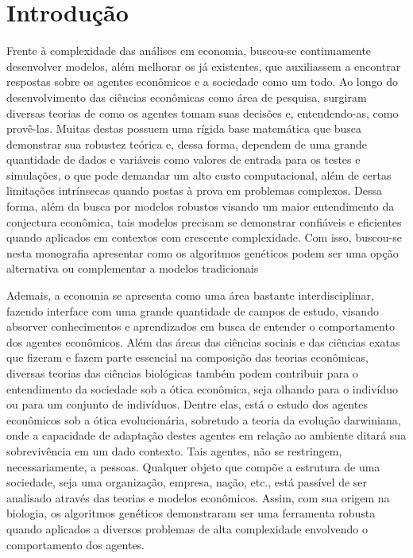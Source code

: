 \chapter{Introdução}

Frente à complexidade das análises em economia, buscou-se continuamente desenvolver modelos, além melhorar os já existentes, que auxiliassem a encontrar respostas sobre os agentes econômicos e a sociedade como um todo. Ao longo do desenvolvimento das ciências econômicas como área de pesquisa, surgiram diversas teorias de como os agentes tomam suas decisões e, entendendo-as, como provê-las. Muitas destas possuem uma rígida base matemática que busca demonstrar sua robustez teórica e, dessa forma, dependem de uma grande quantidade de dados e variáveis como valores de entrada para os testes e simulações, o que pode demandar um alto custo computacional, além de certas limitações intrínsecas quando postas à prova em problemas complexos. Dessa forma, além da busca por modelos robustos visando um maior entendimento da conjectura econômica, tais modelos precisam se demonstrar confiáveis e eficientes quando aplicados em contextos com crescente complexidade. Com isso, buscou-se nesta monografia apresentar como os algoritmos genéticos podem ser uma opção alternativa ou complementar a modelos tradicionais 

Ademais, a economia se apresenta como uma área bastante interdisciplinar, fazendo interface com uma grande quantidade de campos de estudo, visando absorver conhecimentos e aprendizados em busca de entender o comportamento dos agentes econômicos. Além das áreas das ciências sociais e das ciências exatas que fizeram e fazem parte essencial na composição das teorias econômicas, diversas teorias das ciências biológicas também podem contribuir para o entendimento da sociedade sob a ótica econômica, seja olhando para o indivíduo ou para um conjunto de indivíduos. Dentre elas, está o estudo dos agentes econômicos sob a ótica evolucionária, sobretudo a teoria da evolução darwiniana, onde a capacidade de adaptação destes agentes em relação ao ambiente ditará sua sobrevivência em um dado contexto. Tais agentes, não se restringem, necessariamente, a pessoas. Qualquer objeto que compõe a estrutura de uma sociedade, seja uma organização, empresa, nação, etc., está passível de ser analisado através das teorias e modelos econômicos. Assim, com sua origem na biologia, os algoritmos genéticos demonstraram ser uma ferramenta robusta quando aplicados a diversos problemas de alta complexidade envolvendo o comportamento dos agentes.

